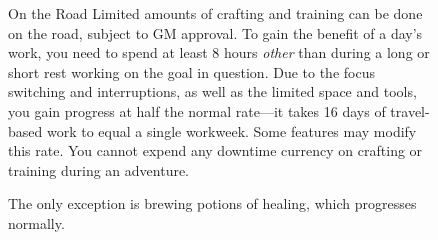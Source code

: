 \begin{figure}
  \begin{DndComment}{On the Road}
    Limited amounts of crafting and training can be done on the road, subject to GM approval. To gain the benefit of a day's work, you need to spend at least 8 hours \textit{other} than during a long or short rest working on the goal in question. Due to the focus switching and interruptions, as well as the limited space and tools, you gain progress at half the normal rate---it takes 16 days of travel-based work to equal a single workweek. Some features may modify this rate. You cannot expend any downtime currency on crafting or training during an adventure.

    The only exception is brewing potions of healing, which progresses normally.
  \end{DndComment}
\end{figure}
